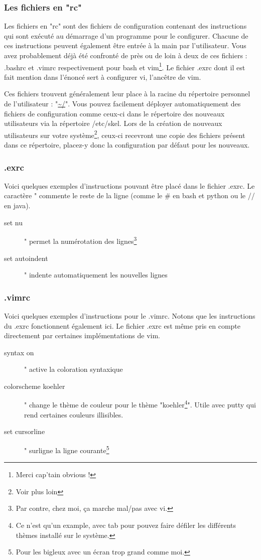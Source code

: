 \documentclass[a4paper]{article}
\begin{document}
\subsubsection{Les fichiers en "rc"}
\par Les fichiers en "rc" sont des fichiers de configuration contenant des instructions qui sont exécuté au démarrage d'un programme pour le configurer. Chacune de ces instructions peuvent également être entrée à la main par l'utilisateur. Vous avez probablement déjà été confronté de près ou de loin à deux de ces fichiers : .bashrc et .vimrc respectivement pour bash et vim\footnote{Merci cap'tain obvious !}. Le fichier .exrc dont il est fait mention dans l'énoncé sert à configurer vi, l'ancêtre de vim.
\par Ces fichiers trouvent généralement leur place à la racine du répertoire personnel de l'utilisateur : "\url{~/}". Vous pouvez facilement déployer automatiquement des fichiers de configuration comme ceux-ci dans le répertoire des nouveaux utilisateurs via la répertoire /etc/skel. Lors de la création de nouveaux utilisateurs sur votre système\footnote{Voir plus loin}, ceux-ci recevront une copie des fichiers présent dans ce répertoire, placez-y donc la configuration par défaut pour les nouveaux.

\subsubsection{.exrc}
\par Voici quelques exemples d'instructions pouvant être placé dans le fichier .exrc. Le caractère " commente le reste de la ligne (comme le \# en bash et python ou le // en java).
\begin{description}
  \item[set nu] " permet la numérotation des lignes\footnote{Par contre, chez moi, ça marche mal/pas avec vi.}
  \item[set autoindent] " indente automatiquement les nouvelles lignes
\end{description}

\subsubsection{.vimrc}
\par Voici quelques exemples d'instructions pour le .vimrc. Notons que les instructions du .exrc fonctionnent également ici. Le fichier .exrc est même pris en compte directement par certaines implémentations de vim.
\begin{description}
  \item[syntax on] " active la coloration syntaxique 
  \item[colorscheme koehler] " change le thème de couleur pour le thème "koehler\footnote{Ce n'est qu'un example, avec tab pour pouvez faire défiler les différents thèmes installé sur le système.}". Utile avec putty qui rend certaines couleurs illisibles.
  \item[set cursorline] " surligne la ligne courante\footnote{Pour les bigleux avec un écran trop grand comme moi.}
\end{description}
\end{document}
